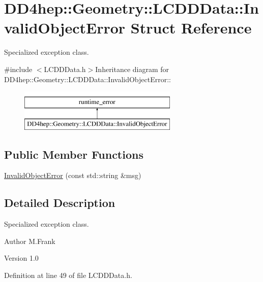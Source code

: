 \hypertarget{struct_d_d4hep_1_1_geometry_1_1_l_c_d_d_data_1_1_invalid_object_error}{
\section{DD4hep::Geometry::LCDDData::InvalidObjectError Struct Reference}
\label{struct_d_d4hep_1_1_geometry_1_1_l_c_d_d_data_1_1_invalid_object_error}
}


Specialized exception class.  


{\ttfamily \#include $<$LCDDData.h$>$}Inheritance diagram for DD4hep::Geometry::LCDDData::InvalidObjectError::\begin{figure}[H]
\begin{center}
\leavevmode
\includegraphics[height=2cm]{struct_d_d4hep_1_1_geometry_1_1_l_c_d_d_data_1_1_invalid_object_error}
\end{center}
\end{figure}
\subsection*{Public Member Functions}
\begin{DoxyCompactItemize}
\item 
\hyperlink{struct_d_d4hep_1_1_geometry_1_1_l_c_d_d_data_1_1_invalid_object_error_aaca6af4a0b1d636f7af31f3191f1d998}{InvalidObjectError} (const std::string \&msg)
\end{DoxyCompactItemize}


\subsection{Detailed Description}
Specialized exception class. \begin{DoxyAuthor}{Author}
M.Frank 
\end{DoxyAuthor}
\begin{DoxyVersion}{Version}
1.0 
\end{DoxyVersion}


Definition at line 49 of file LCDDData.h.

